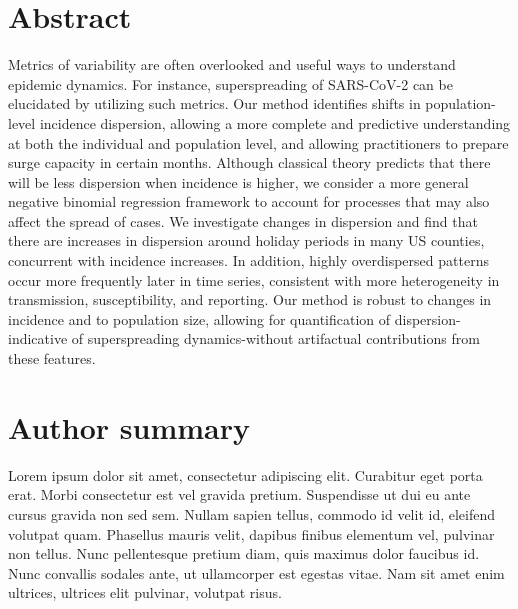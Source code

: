 \documentclass[10pt,letterpaper]{article}
\begin{document}
\section*{Abstract}
Metrics of variability are often overlooked and useful ways to understand epidemic dynamics. For instance, superspreading of SARS-CoV-2 can be elucidated by utilizing such metrics. Our method identifies shifts in population-level incidence dispersion, allowing a more complete and predictive understanding at both the individual and population level, and allowing practitioners to prepare surge capacity in certain months. Although classical theory predicts that there will be less dispersion when incidence is higher, we consider a more general negative binomial regression framework to account for processes that may also affect the spread of cases. We investigate changes in dispersion and find that there are increases in dispersion around holiday periods in many US counties, concurrent with incidence increases. In addition, highly overdispersed patterns occur more frequently later in time series, consistent with more heterogeneity in transmission, susceptibility, and reporting. Our method is robust to changes in incidence and to population size, allowing for quantification of dispersion-indicative of superspreading dynamics-without artifactual contributions from these features.


\section*{Author summary}
Lorem ipsum dolor sit amet, consectetur adipiscing elit. Curabitur eget porta erat. Morbi consectetur est vel gravida pretium. Suspendisse ut dui eu ante cursus gravida non sed sem. Nullam sapien tellus, commodo id velit id, eleifend volutpat quam. Phasellus mauris velit, dapibus finibus elementum vel, pulvinar non tellus. Nunc pellentesque pretium diam, quis maximus dolor faucibus id. Nunc convallis sodales ante, ut ullamcorper est egestas vitae. Nam sit amet enim ultrices, ultrices elit pulvinar, volutpat risus.

\linenumbers

\end{document}
